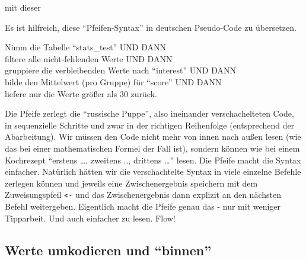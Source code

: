 \documentclass[12pt,]{book}
\newenvironment{Shaded}{\begin{snugshade}}{\end{snugshade}}
\newcommand{\KeywordTok}[1]{\textcolor[rgb]{0.13,0.29,0.53}{\textbf{{#1}}}}
\newcommand{\DataTypeTok}[1]{\textcolor[rgb]{0.13,0.29,0.53}{{#1}}}
\newcommand{\DecValTok}[1]{\textcolor[rgb]{0.00,0.00,0.81}{{#1}}}
\newcommand{\StringTok}[1]{\textcolor[rgb]{0.31,0.60,0.02}{{#1}}}
\newcommand{\CommentTok}[1]{\textcolor[rgb]{0.56,0.35,0.01}{\textit{{#1}}}}
\newcommand{\NormalTok}[1]{{#1}}
\let\BeginKnitrBlock\begin \let\EndKnitrBlock\end
\begin{document}
mit dieser

\begin{Shaded}
\end{Shaded}

Es ist hilfreich, diese ``Pfeifen-Syntax'' in deutschen Pseudo-Code zu
übersetzen.

\BeginKnitrBlock{rmdpseudocode}
Nimm die Tabelle ``stats\_test'' UND DANN\\
filtere alle nicht-fehlenden Werte UND DANN\\
gruppiere die verbleibenden Werte nach ``interest'' UND DANN\\
bilde den Mittelwert (pro Gruppe) für ``score'' UND DANN\\
liefere nur die Werte größer als 30 zurück.
\EndKnitrBlock{rmdpseudocode}

Die Pfeife zerlegt die ``russische Puppe'', also ineinander
verschachelteten Code, in sequenzielle Schritte und zwar in der
richtigen Reihenfolge (entsprechend der Abarbeitung). Wir müssen den
Code nicht mehr von innen nach außen lesen (wie das bei einer
mathematischen Formel der Fall ist), sondern können wie bei einem
Kochrezept ``erstens \ldots{}, zweitens .., drittens \ldots{}'' lesen.
Die Pfeife macht die Syntax einfacher. Natürlich hätten wir die
verschachtelte Syntax in viele einzelne Befehle zerlegen können und
jeweils eine Zwischenergebnis speichern mit dem Zuweisungspfeil
\texttt{\textless{}-} und das Zwischenergebnis dann explizit an den
nächsten Befehl weitergeben. Eigentlich macht die Pfeife genau das - nur
mit weniger Tipparbeit. Und auch einfacher zu lesen. Flow!

\subsection{\texorpdfstring{Werte umkodieren und
``binnen''}{Werte umkodieren und binnen}}\label{werte-umkodieren-und-binnen}
\end{document}
